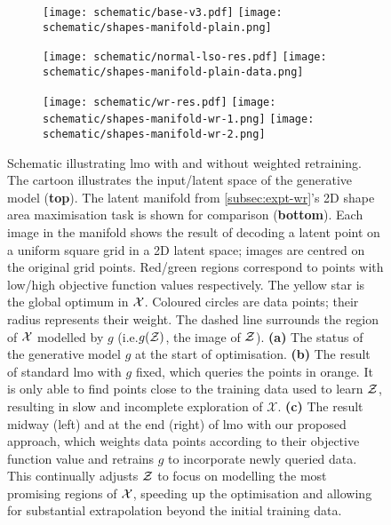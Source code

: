 \begin{figure}
    \centering
    \begin{subfigure}[c]{0.245\textwidth}
        \centering
        \texttt{[image: schematic/base-v3.pdf]}
        \vspace{-5mm}
        \texttt{[image: schematic/shapes-manifold-plain.png]}
        \label{subfig:lso-schematic-a}
    \end{subfigure}
    \begin{subfigure}[c]{0.245\textwidth}
        \centering
        \texttt{[image: schematic/normal-lso-res.pdf]}
        \vspace{-5mm}
        \texttt{[image: schematic/shapes-manifold-plain-data.png]}
        \label{subfig:lso-schematic-b}
    \end{subfigure}
    \begin{subfigure}[c]{0.49\textwidth}
        \centering
        \texttt{[image: schematic/wr-res.pdf]}
        \vspace{-5mm}
        \texttt{[image: schematic/shapes-manifold-wr-1.png]}
        \texttt{[image: schematic/shapes-manifold-wr-2.png]}
        \label{subfig:lso-schematic-c}
    \end{subfigure}
    \caption[Cartoon schematic of \gls{lmo}.]{
    Schematic illustrating \gls{lmo} with and without weighted retraining.
    The cartoon illustrates the input/latent space  of the generative model (\textbf{top}).
    The latent manifold from \cref{subsec:expt-wr}'s 2D shape area maximisation task is shown
    for comparison (\textbf{bottom}).
    Each image in the manifold shows the result of decoding a latent point on a uniform square grid in a 2D latent space;
    images are centred on the original grid points.
    Red/green regions correspond to points with low/high objective function values respectively.
    The yellow star is the global optimum in $\mathcal{X}$.
    Coloured circles are data points; their radius represents their weight.
    The dashed line surrounds the region of $\mathcal{X}$ modelled by $g$ (i.e.\@ $g(\mathcal{Z})$, the image of $\mathcal{Z}$).
    \textbf{(a)} The status of the generative model $g$ at the start of optimisation.
    \textbf{(b)} The result of standard \gls{lmo} with $g$ fixed, which queries the points in orange.
    It is only able to find points close to the training data used to learn $\mathcal{Z}$, resulting in slow and incomplete exploration of $\mathcal{X}$.
    \textbf{(c)} The result midway (left) and at the end (right) of \gls{lmo} with our proposed approach,
    which weights data points according to their objective function value and retrains $g$ to incorporate newly queried data.
    This continually adjusts $\mathcal{Z}$ to focus on modelling the most promising regions of $\mathcal{X}$,
    speeding up the optimisation and allowing for substantial extrapolation beyond the initial training data.
    }
    \label{fig:lso-chpater-schematic}
\end{figure}

